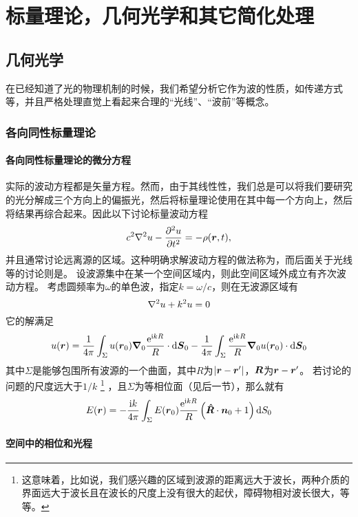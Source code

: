 \chapter{标量理论，几何光学和其它简化处理}

\section{几何光学}

在已经知道了光的物理机制的时候，我们希望分析它作为波的性质，如传递方式等，并且严格处理直觉上看起来合理的“光线”、“波前”等概念。

\subsection{各向同性标量理论}\label{sec:isotropic-scalar}

\subsubsection{各向同性标量理论的微分方程}

实际的波动方程都是矢量方程。然而，由于其线性性，我们总是可以将我们要研究的光分解成三个方向上的偏振光，然后将标量理论使用在其中每一个方向上，然后将结果再综合起来。因此以下讨论标量波动方程
\[
    c^2 \laplacian u - \pdv[2]{u}{t} = - \rho(\vb*{r}, t),
\]
并且通常讨论远离源的区域。这种明确求解波动方程的做法称为，而后面关于光线等的讨论则是。
设波源集中在某一个空间区域内，则此空间区域外成立有齐次波动方程。
考虑圆频率为$\omega$的单色波，指定$k = \omega / c$，则在无波源区域有
\[
    \laplacian u + k^2 u = 0
\]
它的解满足
\[
    u(\vb*{r}) = 
    \frac{1}{4\pi} \int_{\Sigma} u(\vb*{r}_0) \grad_0{\frac{\mathrm{e}^{\mathrm{i} k R}}{R}} \cdot \dd \vb*{S}_0 
    - \frac{1}{4\pi} \int_{\Sigma} \frac{\mathrm{e}^{\mathrm{i} k R}}{R} \grad_0{u(\vb*{r}_0)} \cdot \dd{\vb*{S}_0}
\]
其中$\Sigma$是能够包围所有波源的一个曲面，其中$R$为$\abs{\vb*{r} - \vb*{r}'}$，$\vb*{R}$为$\vb*{r} - \vb*{r}'$。
若讨论的问题的尺度远大于$1/k$%
\footnote{这意味着，比如说，我们感兴趣的区域到波源的距离远大于波长，两种介质的界面远大于波长且在波长的尺度上没有很大的起伏，障碍物相对波长很大，等等。}
，且$\Sigma$为等相位面（见后一节），那么就有
\begin{equation}
    E(\vb*{r}) = - \frac{\mathrm{i} k}{4\pi} \int_\Sigma E(\vb*{r}_0) \frac{\mathrm{e}^{\mathrm{i} k R}}{R} \left( \vu*{R} \cdot \vb*{n}_0 + 1 \right) \dd{S_0}
    \label{eq:kirchhoff-formula}
\end{equation}

\subsubsection{空间中的相位和光程}\label{sec:phrase-and-l}

